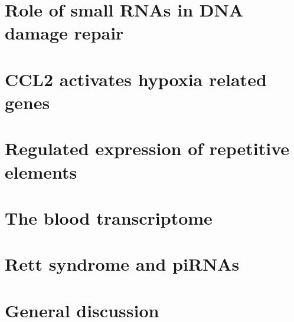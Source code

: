 \documentclass[12pt,a4paper]{report}
\begin{document}
\chapter{Role of small RNAs in DNA damage repair}



\chapter{CCL2 activates hypoxia related genes}


\chapter{Regulated expression of repetitive elements}


\chapter{The blood transcriptome}


\chapter{Rett syndrome and piRNAs}



%

\chapter{General discussion}




\end{document}
